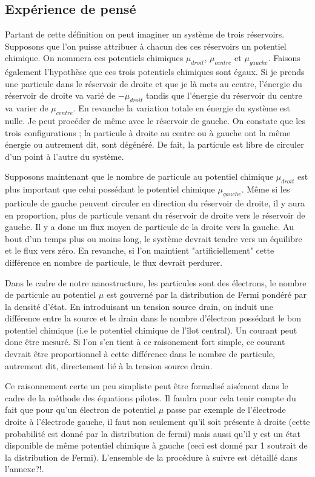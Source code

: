 \subsection{Expérience de pensé}
Partant de cette définition on peut imaginer un système de trois réservoirs. Supposons que l'on puisse attribuer à chacun des ces réservoirs un potentiel chimique. On nommera ces potentiels chimiques $\mu_{droit}$, $\mu_{centre}$ et $\mu_{gauche}$. Faisons également l'hypothèse que ces trois potentiels chimiques sont égaux. Si je prends une particule dans le réservoir de droite et que je là mets au centre, l'énergie du réservoir de droite va varié de $-\mu_{droit}$ tandis que l'énergie du réservoir du centre va varier de $\mu_{centre}$. En revanche la variation totale en énergie du système est nulle. Je peut procéder de m\^eme avec le réservoir de gauche. On constate que les trois configurations ; la particule à droite au centre ou à gauche ont la m\^eme énergie ou autrement dit, sont dégénéré. De fait, la particule est libre de circuler d'un point à l'autre du système. 


Supposons maintenant que le nombre de particule au potentiel chimique $\mu_{droit}$ est plus important que celui possédant le potentiel chimique $\mu_{gauche}$. M\^eme si les particule de gauche peuvent circuler en direction du réservoir de droite, il y aura en proportion, plus de particule venant du réservoir de droite vers le réservoir de gauche. Il y a donc un flux moyen de particule de la droite vers la gauche. Au bout d'un temps plus ou moins long, le système devrait tendre vers un équilibre et le flux vers zéro. En revanche, si l'on maintient "artificiellement" cette différence en nombre de particule, le flux devrait perdurer.

Dans le cadre de notre nanostructure, les particules sont des électrons, le nombre de particule au potentiel $\mu$ est gouverné par la distribution de Fermi pondéré par la densité d'état. En introduisant un tension source drain, on induit une différence entre la source et le drain dans le nombre d'électron possédant le bon potentiel chimique (i.e le potentiel chimique de l'\^ilot central). Un courant peut donc \^etre mesuré. Si l'on s'en tient à ce raisonement fort simple, ce courant devrait \^etre proportionnel à cette différence dans le nombre de particule, autrement dit, directement lié à la tension source drain.

Ce raisonnement certe un peu simpliste peut \^etre formalisé aisément dans le cadre de la méthode des équations pilotes. Il faudra pour cela tenir compte du fait que pour qu'un électron de potentiel $\mu$ passe par exemple de l'électrode droite à l'électrode gauche, il faut non seulement qu'il soit présente à droite (cette probabilité est donné par la distribution de fermi) mais aussi qu'il y est un état disponible de m\^eme potentiel chimique à gauche (ceci est donné par 1 soutrait de la distribution de Fermi). L'ensemble de la procédure à suivre est détaillé dans l'annexe?!.

